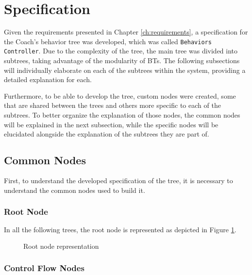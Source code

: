 \section{Specification}
\label{sec:specification}

Given the requirements presented in Chapter \ref{ch:requirements}, a specification for the Coach's behavior tree was developed, which was called \texttt{Behaviors Controller}. Due to the complexity of the tree, the main tree was divided into subtrees, taking advantage of the modularity of BTs. The following subsections will individually elaborate on each of the subtrees within the system, providing a detailed explanation for each.

Furthermore, to be able to develop the tree, custom nodes were created, some that are shared between the trees and others more specific to each of the subtrees. To better organize the explanation of those nodes, the common nodes will be explained in the next subsection, while the specific nodes will be elucidated alongside the explanation of the subtrees they are part of.

\subsection{Common Nodes}
\label{subsec:common_nodes_spec}

First, to understand the developed specification of the tree, it is necessary to understand the common nodes used to build it.

\subsubsection{Root Node}

In all the following trees, the root node is represented as depicted in Figure \ref{fig:root_node_spec}.

\begin{figure}[!h]
    \centering
    \begin{forest}
    \end{forest}
    \caption{Root node representation}
    \label{fig:root_node_spec}
\end{figure}

\subsubsection{Control Flow Nodes}
\label{subsubsec:control_nodes_spec}

